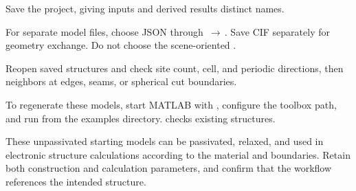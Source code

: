 \begin{steps}
  \item Save the project, giving inputs and derived results distinct names.
  \item For separate model files, choose JSON through \,$\rightarrow$\,. Save CIF separately for geometry exchange. Do not choose the scene-oriented .
  \item Reopen saved structures and check site count, cell, and periodic directions, then neighbors at edges, seams, or spherical cut boundaries.
  \item To regenerate these models, start MATLAB\regmark{} with , configure the toolbox path, and run  from the examples directory.  checks existing structures.
\end{steps}

These unpassivated starting models can be passivated, relaxed, and used in electronic structure calculations according to the material and boundaries. Retain both construction and calculation parameters, and confirm that the workflow references the intended structure.
